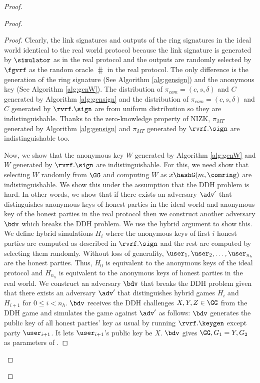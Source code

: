 \begin{proof}
\begin{proof}
		\begin{proof}
			Clearly, the link signatures and outputs of the ring signatures in the ideal world identical to the real world protocol because the link signature is generated by $ \simulator $ as in the real protocol and the outputs are randomly selected by $ \fgvrf $ as the random oracle $ \hash $ in the real protocol. The only difference is the generation of the ring signature (See Algorithm \ref{alg:gensign}) and the anonymous key (See Algorithm \ref{alg:genW}). The distribution of $ \pi_{com} = (c,s,\delta) $ and $ C $ generated by Algorithm \ref{alg:gensign} and the distribution of $ \pi_{com} = (c,s,\delta) $ and $ C $ generated by $ \rvrf.\sign $ are from uniform distribution so they are indistinguishable. Thanks to the zero-knowledge property of NIZK, $ \pi_{MT} $ generated by Algorithm \ref{alg:gensign} and $ \pi_{MT} $ generated by $ \rvrf.\sign $ are indistinguishable too.  
			
			Now, we show that the anonymous key $ W $ generated by Algorithm \ref{alg:genW} and $	 W $ generated by $ \rvrf.\sign $ are indistinguishable. For this,  we need show that selecting $ W $ randomly from $ \GG $ and computing $ W $ as $x \hashG(m, \comring) $ are indistinguishable.
			We  show this under the assumption that the DDH problem  is hard.  In other words, we show that if there exists an adversary $ \adv' $ that distinguishes anonymous keys of honest parties in the ideal world and anonymous key of the honest parties in the real protocol then we construct another adversary $ \bdv $ which breaks the DDH problem. 
			We use the hybrid argument to show this.
			We define hybrid simulations $ H_{i} $ where  the anonymous keys of first $ i $ honest parties are computed as described in $ \rvrf.\sign $ and the rest are computed by selecting them randomly. Without loss of generality, $ \user_1, \user_2, \ldots, \user_{n_h} $ are the honest parties. Thus, $ H_0 $ is equivalent to the anonymous keys of the ideal protocol  and $ H_{n_h}  $ is equivalent to the anonymous keys of honest parties in the real world.  We construct an adversary $ \bdv $ that breaks the DDH problem given that there exists an adversary $ \adv' $ that distinguishes hybrid games $ H_i $ and $ H_{i + 1} $ for $ 0 \leq i < n_h $. $\bdv $ receives the DDH challenges $ X,Y, Z \in \GG $ from the DDH game and simulates the game against $ \adv' $ as follows: $\bdv $ generates the public key of all  honest parties' key as usual by running $ \rvrf.\keygen$ except party $ \user_{i+1} $. It lets $ \user_{i+1} $'s public key be $ X $. $ \bdv $ gives $ \GG, G_1 = Y, G_2 $ as parameters of \name. 
			

\end{proof}
\end{proof}
\end{proof}
